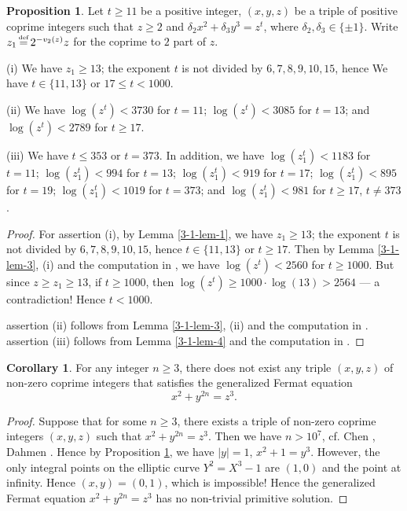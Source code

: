 \documentclass[a4paper, 12pt]{article}
\DeclareMathOperator{\defeq}{\overset{\text{\tiny{def}}}{=}}
\numberwithin{equation}{section}
\theoremstyle{definition}
\newtheorem{prop}[thm]{Proposition}
\newtheorem{cor}[thm]{Corollary}
\begin{document}
\begin{prop} \label{3-1-prop}
Let $t\ge 11$ be a positive integer, $(x,y,z)$ be a triple of positive coprime integers such that $z\ge 2$ and $\delta_2 x^2 + \delta_3 y^3 = z^t$, where $\delta_2,\delta_3 \in \{\pm 1\}$. Write $z_1 \defeq 2^{-v_2(z)} z$ for the coprime to $2$ part of $z$.

(i) We have $z_1 \ge 13$; the exponent $t$ is not divided by $6,7,8,9,10,15$, hence We have $t \in \{11,13\}$ or $17\le t < 1000$.

(ii) We have $\log(z^t) < 3730$ for $t = 11$; $\log(z^t) < 3085$ for $t = 13$; and $\log(z^t) < 2789$ for $t \ge 17$.

(iii) We have $t\le 353$ or $t=373$. In addition, we have 
$\log(z_1^t) < 1183$ for $t = 11$; $\log(z_1^t) < 994$ for $t = 13$; 
$\log(z_1^t) < 919$ for $t = 17$; $\log(z_1^t) < 895$ for $t = 19$; 
$\log(z_1^t) < 1019$ for $t = 373$; and  $\log(z_1^t) < 981$ for $t \ge 17$, $t\neq 373$.
\end{prop}
\begin{proof}
For assertion (i), by Lemma \ref{3-1-lem-1}, we have $z_1 \ge 13$; the exponent $t$ is not divided by $6,7,8,9,10,15$, hence $t \in \{11,13\}$ or $t \ge 17$.
Then by Lemma \ref{3-1-lem-3}, (i) and the computation in \cite{code_of_zpzhou}, we have $\log(z^t) < 2560$ for $t \ge 1000$. But since $z\ge z_1 \ge 13$, if $t\ge 1000$, then $\log(z^t) \ge 1000 \cdot \log(13) > 2564$ --- a contradiction! Hence $t < 1000$.

assertion (ii) follows from Lemma \ref{3-1-lem-3}, (ii) and the computation in \cite{code_of_zpzhou}.
assertion (iii) follows from Lemma \ref{3-1-lem-4} and the computation in \cite{code_of_zpzhou}.
\end{proof}

\begin{cor} \label{3-1-cor}
For any integer $n\ge 3$, there does not exist any triple $(x, y, z)$ of non-zero coprime integers that satisfies the generalized Fermat equation
$$ x^2 + y^{2n}= z^3 .$$
\end{cor}
\begin{proof}
Suppose that for some $n \ge 3$, there exists a triple of non-zero coprime integers $(x, y, z)$ such that $ x^2 + y^{2n} = z^3 .$ Then we have $n > 10^7$, cf. Chen \cite{Chen-21}, Dahmen \cite{Dahmen-29}. 
Hence by Proposition \ref{3-1-prop}, we have $|y|=1$, $ x^2 + 1 = y^3$.
However, the only integral points on the elliptic curve $Y^2 = X^3 - 1$ are $(1,0)$ and the point at infinity. Hence $(x,y) = (0,1)$, which is impossible!
Hence  the generalized Fermat equation
$ x^2 + y^{2n}= z^3 $ has no non-trivial primitive solution.
\end{proof}
\end{document}
